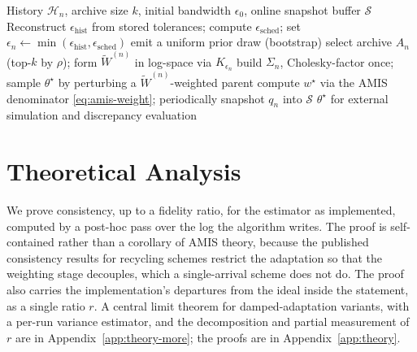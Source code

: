\documentclass[pdflatex,sn-mathphys-num]{sn-jnl}
\theoremstyle{plain}
\theoremstyle{definition}
\begin{document}
\begin{algorithm}
\caption{History-reconstructed, single-arrival-driven ABC update}\label{alg:async-abc}
\begin{algorithmic}[1]
\Require History $\mathcal{H}_n$, archive size $k$, initial bandwidth $\epsilon_0$, online snapshot buffer $\mathcal{S}$
\State Reconstruct $\epsilon_{\text{hist}}$ from stored tolerances; compute $\epsilon_{\text{sched}}$; set $\epsilon_n \gets \min(\epsilon_{\text{hist}},\epsilon_{\text{sched}})$
 \State emit a uniform prior draw (bootstrap) 
\Else
  \State select archive $A_n$ (top-$k$ by $\rho$); form $\tilde W^{(n)}$ in log-space via $K_{\epsilon_n}$
  \State build $\Sigma_n$, Cholesky-factor once; sample $\theta^\star$ by perturbing a $\tilde W^{(n)}$-weighted parent
  \State compute $w^\star$ via the AMIS denominator \eqref{eq:amis-weight}; periodically snapshot $q_n$ into $\mathcal{S}$
\EndIf
\State \Return $\theta^\star$ for external simulation and discrepancy evaluation
\end{algorithmic}
\end{algorithm}


\section{Theoretical Analysis}\label{sec:theory}
We prove consistency, up to a fidelity ratio, for the estimator as implemented, computed by a post-hoc pass over the log the algorithm writes. The proof is self-contained rather than a corollary of AMIS theory, because the published consistency results for recycling schemes \cite{marin2019consistency} restrict the adaptation so that the weighting stage decouples, which a single-arrival scheme does not do. The proof also carries the implementation's departures from the ideal inside the statement, as a single ratio $r$. A central limit theorem for damped-adaptation variants, with a per-run variance estimator, and the decomposition and partial measurement of $r$ are in Appendix~\ref{app:theory-more}; the proofs are in Appendix~\ref{app:theory}.
\end{document}
